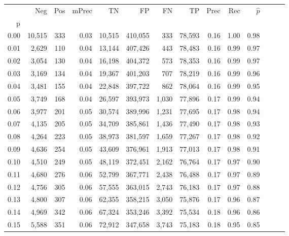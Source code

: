 \begin{tabular}{rrrrrrrrrrrrrr}
\toprule
{} &     Neg &    Pos & mPrec &       TN &       FP &      FN &      TP &  Prec &   Rec & $\hat{p}$ \\
p    &         &        &       &          &          &         &         &       &       &           \\
\midrule
0.00 &  10,515 &    333 &  0.03 &   10,515 &  410,055 &     333 &  78,593 &  0.16 &  1.00 &      0.98 \\
0.01 &   2,629 &    110 &  0.04 &   13,144 &  407,426 &     443 &  78,483 &  0.16 &  0.99 &      0.97 \\
0.02 &   3,054 &    130 &  0.04 &   16,198 &  404,372 &     573 &  78,353 &  0.16 &  0.99 &      0.97 \\
0.03 &   3,169 &    134 &  0.04 &   19,367 &  401,203 &     707 &  78,219 &  0.16 &  0.99 &      0.96 \\
0.04 &   3,481 &    155 &  0.04 &   22,848 &  397,722 &     862 &  78,064 &  0.16 &  0.99 &      0.95 \\
0.05 &   3,749 &    168 &  0.04 &   26,597 &  393,973 &   1,030 &  77,896 &  0.17 &  0.99 &      0.94 \\
0.06 &   3,977 &    201 &  0.05 &   30,574 &  389,996 &   1,231 &  77,695 &  0.17 &  0.98 &      0.94 \\
0.07 &   4,135 &    205 &  0.05 &   34,709 &  385,861 &   1,436 &  77,490 &  0.17 &  0.98 &      0.93 \\
0.08 &   4,264 &    223 &  0.05 &   38,973 &  381,597 &   1,659 &  77,267 &  0.17 &  0.98 &      0.92 \\
0.09 &   4,636 &    254 &  0.05 &   43,609 &  376,961 &   1,913 &  77,013 &  0.17 &  0.98 &      0.91 \\
0.10 &   4,510 &    249 &  0.05 &   48,119 &  372,451 &   2,162 &  76,764 &  0.17 &  0.97 &      0.90 \\
0.11 &   4,680 &    276 &  0.06 &   52,799 &  367,771 &   2,438 &  76,488 &  0.17 &  0.97 &      0.89 \\
0.12 &   4,756 &    305 &  0.06 &   57,555 &  363,015 &   2,743 &  76,183 &  0.17 &  0.97 &      0.88 \\
0.13 &   4,800 &    307 &  0.06 &   62,355 &  358,215 &   3,050 &  75,876 &  0.17 &  0.96 &      0.87 \\
0.14 &   4,969 &    342 &  0.06 &   67,324 &  353,246 &   3,392 &  75,534 &  0.18 &  0.96 &      0.86 \\
0.15 &   5,588 &    351 &  0.06 &   72,912 &  347,658 &   3,743 &  75,183 &  0.18 &  0.95 &      0.85 \\

\end{tabular}
